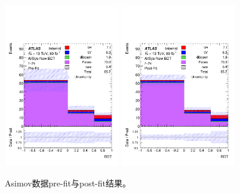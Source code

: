\begin{figure}[htbp]
\centering
\begin{center}
  \includegraphics[width=0.45\textwidth, keepaspectratio]{fig/OneLepTwoTaus/h1l2tau.pdf}
  \includegraphics[width=0.45\textwidth, keepaspectratio]{fig/OneLepTwoTaus/h1l2tau_postFit.pdf}
\end{center}
\caption{Asimov数据pre-fit与post-fit结果。}
\label{Fig:1l2tau.asimov}
\end{figure}

